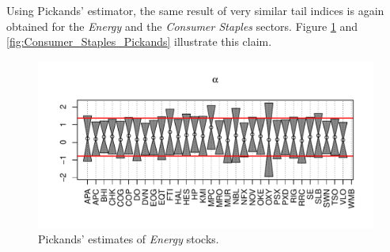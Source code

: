 \documentclass{article}
\newcommand{\1}[1]{
  \mathbf{1}_{\{#1\}}
}
\begin{document}


Using Pickands' estimator, the same result of very similar tail indices
is again obtained for the {\it Energy} and the {\it Consumer Staples}
sectors. Figure \ref{fig:Energy_Pickands} and
\ref{fig:Consumer_Staples_Pickands} illustrate this claim.
\begin{figure}[htb!]
  \includegraphics[width=\textwidth]{Energy_Pickands.pdf}
  \caption{Pickands' estimates of {\it Energy} stocks.}
  \label{fig:Energy_Pickands}
\end{figure}
\end{document}
